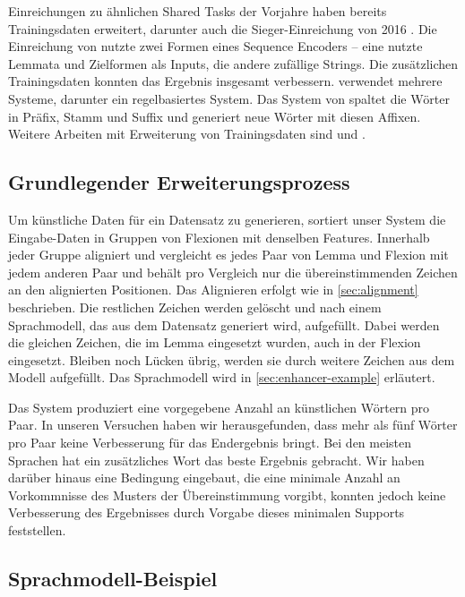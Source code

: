 \documentclass[a4paper]{article}
\begin{document}
Einreichungen zu ähnlichen Shared Tasks der Vorjahre haben bereits Trainingsdaten erweitert, darunter auch die Sieger-Einreichung von 2016 \cite{kann-schutze:2016:SIGMORPHON}. Die Einreichung von \citet{bergmanis:augmenting} nutzte zwei Formen eines Sequence Encoders -- eine nutzte Lemmata und Zielformen als Inputs, die andere zufällige Strings.  Die zusätzlichen Trainingsdaten konnten das Ergebnis insgesamt verbessern. \citet{kann-schutze:2017:K17-20} verwendet mehrere Systeme, darunter ein regelbasiertes System. Das System von \citet{silfverberg-EtAl:2017:K17-20} spaltet die Wörter in Präfix, Stamm und Suffix und generiert neue Wörter mit diesen Affixen. Weitere Arbeiten mit Erweiterung von Trainingsdaten sind \cite{zhou-neubig:2017:K17-20} und \cite{nicolai-EtAl:2017:K17-20}.

\subsection{Grundlegender Erweiterungsprozess}
Um künstliche Daten für ein Datensatz zu generieren, sortiert unser System die Eingabe-Daten in Gruppen von Flexionen mit denselben Features. Innerhalb jeder Gruppe aligniert und vergleicht es jedes Paar von Lemma und Flexion mit jedem anderen Paar und behält pro Vergleich nur die übereinstimmenden Zeichen an den alignierten Positionen. Das Alignieren erfolgt wie in \autoref{sec:alignment} beschrieben. Die restlichen Zeichen werden gelöscht und nach einem Sprachmodell, das aus dem Datensatz generiert wird, aufgefüllt. Dabei werden die gleichen Zeichen, die im Lemma eingesetzt wurden, auch in der Flexion eingesetzt. Bleiben noch Lücken übrig, werden sie durch weitere Zeichen aus dem Modell aufgefüllt. Das Sprachmodell wird in \autoref{sec:enhancer-example} erläutert.

Das System produziert eine vorgegebene Anzahl an künstlichen Wörtern pro Paar. In unseren Versuchen haben wir herausgefunden, dass mehr als fünf Wörter pro Paar keine Verbesserung für das Endergebnis bringt. Bei den meisten Sprachen hat ein zusätzliches Wort das beste Ergebnis gebracht. Wir haben darüber hinaus eine Bedingung eingebaut, die eine minimale Anzahl an Vorkommnisse des Musters der Übereinstimmung vorgibt, konnten jedoch keine Verbesserung des Ergebnisses durch Vorgabe dieses minimalen Supports feststellen.

\subsection{Sprachmodell-Beispiel}
\label{sec:enhancer-example}
\end{document}
